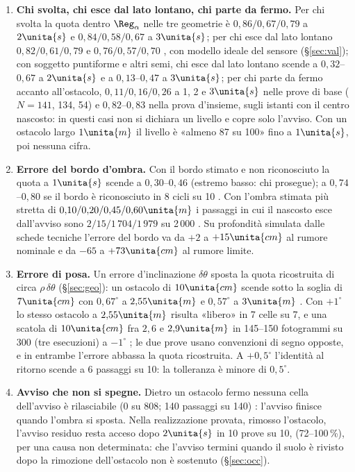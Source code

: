 \begin{enumerate}[label=\arabic*.,ref=\arabic*,leftmargin=1.8em]
\item \textbf{Chi svolta, chi esce dal lato lontano, chi parte da fermo.} Per chi svolta la quota dentro $\Reg_\alpha$ nelle tre geometrie è $0{,}86/0{,}67/0{,}79$ a $2\unita{s}$ e $0{,}84/0{,}58/0{,}67$ a $3\unita{s}$; per chi esce dal lato lontano $0{,}82/0{,}61/0{,}79$ e $0{,}76/0{,}57/0{,}70$ , con modello ideale del sensore (\S\ref{sec:val}); con soggetto puntiforme e altri semi, chi esce dal lato lontano scende a $0{,}32$--$0{,}67$ a $2\unita{s}$ e a $0{,}13$--$0{,}47$ a $3\unita{s}$; per chi parte da fermo accanto all'ostacolo, $0{,}11/0{,}16/0{,}26$ a 1, 2 e $3\unita{s}$ nelle prove di base ($N=141$, 134, 54) e $0{,}82$--$0{,}83$ nella prova d'insieme, sugli istanti con il centro nascosto: in questi casi non si dichiara un livello e copre solo l'avviso. Con un ostacolo largo $1\unita{m}$ il livello è «almeno 87 su 100» fino a $1\unita{s}$, poi nessuna cifra.
\item \textbf{Errore del bordo d'ombra.} Con il bordo stimato e non riconosciuto la quota a $1\unita{s}$ scende a $0{,}30$--$0{,}46$ (estremo basso: chi prosegue); a $0{,}74$--$0{,}80$ se il bordo è riconosciuto in 8 cicli su 10 . Con l'ombra stimata più stretta di $0{,}10/0{,}20/0{,}45/0{,}60\unita{m}$ i passaggi in cui il nascosto esce dall'avviso sono $2/15/1\,704/1\,979$ su 2\,000 . Su profondità simulata dalle schede tecniche l'errore del bordo va da $+2$ a $+15\unita{cm}$ al rumore nominale e da $-65$ a $+73\unita{cm}$ al rumore limite.
\item\label{lim:posa} \textbf{Errore di posa.} Un errore d'inclinazione $\delta\theta$ sposta la quota ricostruita di circa $\rho\,\delta\theta$ (\S\ref{sec:geo}): un ostacolo di $10\unita{cm}$ scende sotto la soglia di $7\unita{cm}$ con $0{,}67^\circ$ a $2{,}55\unita{m}$ e $0{,}57^\circ$ a $3\unita{m}$ . Con $+1^\circ$ lo stesso ostacolo a $2{,}55\unita{m}$ risulta «libero» in 7 celle su 7, e una scatola di $10\unita{cm}$ fra $2{,}6$ e $2{,}9\unita{m}$ in 145--150 fotogrammi su 300 (tre esecuzioni) a $-1^\circ$ ; le due prove usano convenzioni di segno opposte, e in entrambe l'errore abbassa la quota ricostruita. A $+0{,}5^\circ$ l'identità al ritorno scende a 6 passaggi su 10: la tolleranza è minore di $0{,}5^\circ$.
\item \textbf{Avviso che non si spegne.} Dietro un ostacolo fermo nessuna cella dell'avviso è rilasciabile (0 su 808; 140 passaggi su 140) : l'avviso finisce quando l'ombra si sposta. Nella realizzazione provata, rimosso l'ostacolo, l'avviso residuo resta acceso dopo $2\unita{s}$ in 10 prove su 10, (72--100\,\%), per una causa non determinata: che l'avviso termini quando il suolo è rivisto dopo la rimozione dell'ostacolo non è sostenuto  (\S\ref{sec:occ}).

\end{enumerate}
